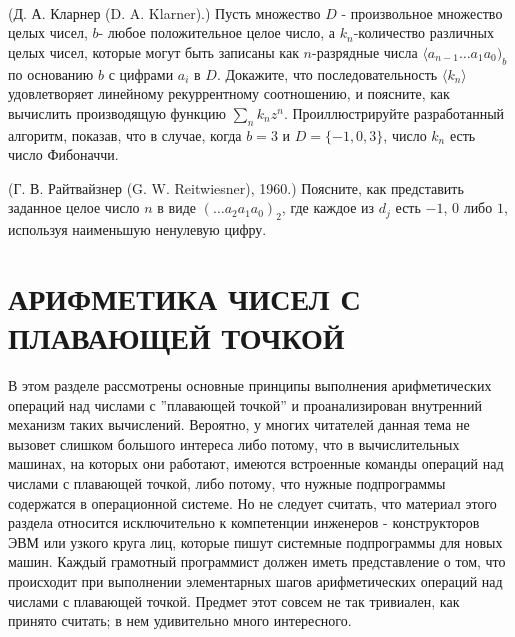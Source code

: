 \paragraph{}  (Д. А. Кларнер (D. A. Klarner).) Пусть множество $D$ - произвольное множество целых чисел, $b$- любое положительное целое число, а $k_{n}$-количество различных целых чисел, которые могут быть записаны как $n$-разрядные числа $\langle a_{n - 1}  \ldots  a_{1}a_{0})_{b}$ по основанию $b$ с цифрами $a_{i}$ в $D$. Докажите, что последовательность $\langle k_{n}\rangle$ удовлетворяет линейному рекуррентному соотношению, и поясните, как вычислить производящую функцию $\sum_{n}k_{n}z^{n}$. Проиллюстрируйте разработанный алгоритм, показав, что в случае, когда $b = 3$ и $D = \lbrace-1,0,3\rbrace$, число $k_{n}$ есть число Фибоначчи.

\paragraphT{}  (Г. В. Райтвайзнер (G. W. Reitwiesner), 1960.) Поясните, как представить заданное целое число $n$ в виде $( \ldots  a_{2}a_{1}a_{0})_{2}$, где каждое из $d_{j}$ есть $-1$, $0$ либо $1$, используя наименьшую ненулевую цифру.
\newpage
\section{АРИФМЕТИКА ЧИСЕЛ С ПЛАВАЮЩЕЙ ТОЧКОЙ}

\large{В этом разделе} рассмотрены основные принципы выполнения арифметических операций над числами с ''плавающей точкой'' и проанализирован внутренний механизм таких вычислений. Вероятно, у многих читателей данная тема не вызовет слишком большого интереса либо потому, что в вычислительных машинах, на которых они работают, имеются встроенные команды операций над числами с плавающей точкой, либо потому, что нужные подпрограммы содержатся в операционной системе. Но не следует считать, что материал этого раздела относится исключительно к компетенции инженеров - конструкторов ЭВМ или узкого круга лиц, которые пишут системные подпрограммы для новых машин. Каждый грамотный программист должен иметь представление о том, что происходит при выполнении элементарных шагов арифметических операций над числами с плавающей точкой. Предмет этот совсем не так тривиален, как принято считать; в нем удивительно много интересного.
